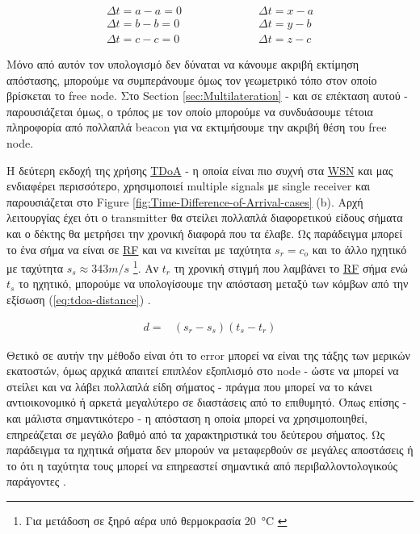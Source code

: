 \begin{align}
	\Delta t = a-a = 0 \quad \quad \quad & \quad \quad \quad\Delta t = x-a \nonumber \\
	\Delta t = b-b = 0 \quad \quad \quad & \quad \quad \quad\Delta t = y-b \nonumber \\
	\Delta t = c-c = 0 \quad \quad \quad & \quad \quad \quad\Delta t = z-c \nonumber
\end{align}

Μόνο από αυτόν τον υπολογισμό δεν δύναται να κάνουμε ακριβή εκτίμηση απόστασης, 
μπορούμε να συμπεράνουμε όμως τον γεωμετρικό τόπο στον οποίο βρίσκεται το free node. Στο Section \ref{sec:Multilateration} - και σε επέκταση αυτού -
παρουσιάζεται όμως, ο τρόπος με τον οποίο μπορούμε να συνδυάσουμε τέτοια πληροφορία από πολλαπλά beacon για να εκτιμήσουμε την ακριβή θέση του free node.

Η δεύτερη εκδοχή της χρήσης \hyperref[abbr:TDoA]{TDoA} - η οποία είναι πιο συχνή στα \hyperref[abbr:WSN]{WSN} και μας ενδιαφέρει περισσότερο, 
χρησιμοποιεί multiple signals με single receiver και παρουσιάζεται στο Figure \ref{fig:Time-Difference-of-Arrival-cases} (b). 
Αρχή λειτουργίας έχει ότι ο transmitter θα στείλει πολλαπλά διαφορετικού είδους σήματα και ο δέκτης θα μετρήσει την χρονική διαφορά 
που τα έλαβε. Ως παράδειγμα μπορεί το ένα σήμα να είναι σε \hyperref[abbr:RF]{RF} και να κινείται με ταχύτητα $s_r=c_o$ και το άλλο 
ηχητικό με ταχύτητα $s_s \approx 343m/s$ \footnote{Για μετάδοση σε ξηρό αέρα υπό θερμοκρασία \SI{20}{\celsius} \cite{wikipedia-speed-of-sound}}. 
Αν $t_r$ τη χρονική στιγμή που λαμβάνει το \hyperref[abbr:RF]{RF} σήμα ενώ $t_s$ το ηχητικό,
μπορούμε να υπολογίσουμε την απόσταση μεταξύ των κόμβων από την εξίσωση (\ref{eq:tdoa-distance})
\cite{wsn-Localization-systems}.

\begin{align}
	d=&(s_r-s_s)(t_s-t_r) \label{eq:tdoa-distance}
\end{align}

Θετικό σε αυτήν την μέθοδο είναι ότι το error μπορεί να είναι της τάξης των μερικών εκατοστών, όμως αρχικά απαιτεί επιπλέον εξοπλισμό στο node -
ώστε να μπορεί να στείλει και να λάβει πολλαπλά είδη σήματος - πράγμα που μπορεί να το κάνει αντιοικονομικό ή αρκετά μεγαλύτερο σε διαστάσεις από 
το επιθυμητό. Όπως επίσης - και μάλιστα  
σημαντικότερο - η απόσταση η οποία μπορεί να 
χρησιμοποιηθεί, επηρεάζεται σε μεγάλο βαθμό από τα χαρακτηριστικά του δεύτερου σήματος. Ως παράδειγμα τα ηχητικά σήματα 
δεν μπορούν να μεταφερθούν σε μεγάλες αποστάσεις ή το ότι η ταχύτητα τους μπορεί να επηρεαστεί σημαντικά από περιβαλλοντολογικούς παράγοντες
\cite{farooqiazam2016location}.

